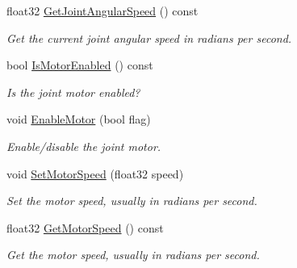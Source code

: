 \begin{DoxyCompactItemize}
\mbox{\label{classb2WheelJoint_aaf5a4e3713ceca98c2afda950e67ff9d}} 
float32 \hyperlink{classb2WheelJoint_aaf5a4e3713ceca98c2afda950e67ff9d}{Get\+Joint\+Angular\+Speed} () const
\begin{DoxyCompactList}\small\item\em Get the current joint angular speed in radians per second. \end{DoxyCompactList}\item 
\mbox{\label{classb2WheelJoint_aef7948a18ec2784397a1d3745824cd78}} 
bool \hyperlink{classb2WheelJoint_aef7948a18ec2784397a1d3745824cd78}{Is\+Motor\+Enabled} () const
\begin{DoxyCompactList}\small\item\em Is the joint motor enabled? \end{DoxyCompactList}\item 
\mbox{\label{classb2WheelJoint_a7a832d814bdda135a78fad41ba671da6}} 
void \hyperlink{classb2WheelJoint_a7a832d814bdda135a78fad41ba671da6}{Enable\+Motor} (bool flag)
\begin{DoxyCompactList}\small\item\em Enable/disable the joint motor. \end{DoxyCompactList}\item 
\mbox{\label{classb2WheelJoint_a6e3255fcf5c82b979ad7e3dc1c089c0b}} 
void \hyperlink{classb2WheelJoint_a6e3255fcf5c82b979ad7e3dc1c089c0b}{Set\+Motor\+Speed} (float32 speed)
\begin{DoxyCompactList}\small\item\em Set the motor speed, usually in radians per second. \end{DoxyCompactList}\item 
\mbox{\label{classb2WheelJoint_a47774ba5dfc1a6a5f15bcc651eea8127}} 
float32 \hyperlink{classb2WheelJoint_a47774ba5dfc1a6a5f15bcc651eea8127}{Get\+Motor\+Speed} () const
\begin{DoxyCompactList}\small\item\em Get the motor speed, usually in radians per second. \end{DoxyCompactList}\item 
\mbox{\label{classb2WheelJoint_a8aae3cd624ec9d48fc86c325c4595edc}} 

\end{DoxyCompactItemize}
